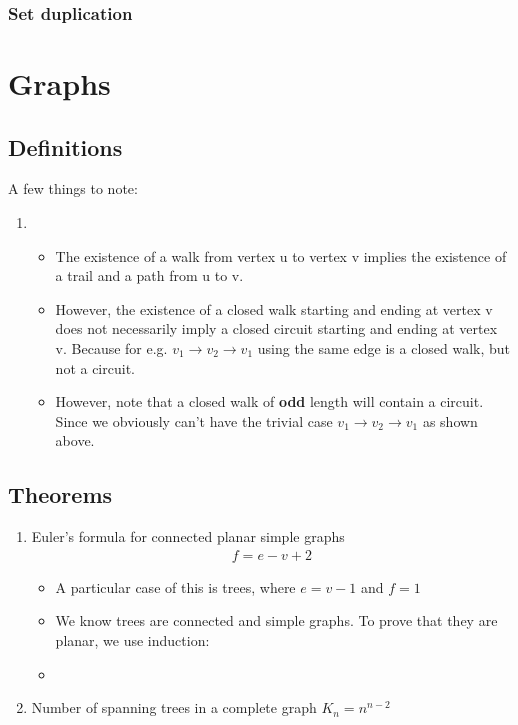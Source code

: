 \documentclass{article}
\begin{document}
\subsubsection{Set duplication}

\section{Graphs}

\subsection{Definitions}
A few things to note:
\begin{enumerate}
	\item \begin{itemize}
		\item The existence of a walk from vertex u to vertex v implies the existence of a trail and a path from u to v. 
		\item However, the existence of a closed walk starting and ending at vertex v does not necessarily imply a closed circuit starting and ending at vertex v. Because for e.g. $v_1 \rightarrow v_2 \rightarrow v_1$ using the same edge is a closed walk, but not a circuit.
		\item However, note that a closed walk of \textbf{odd} length will contain a circuit. Since we obviously can't have the trivial case $v_1 \rightarrow v_2 \rightarrow v_1$ as shown above.
	\end{itemize}
\end{enumerate}

\subsection{Theorems}
\begin{enumerate}
	\item Euler's formula for connected planar simple graphs
	\begin{align*}
		f = e - v + 2
	\end{align*}
	\begin{itemize}
		\item A particular case of this is trees, where $e=v-1$ and $f=1$
		\item We know trees are connected and simple graphs. To prove that they are planar, we use induction:
		\item 
	\end{itemize}
	\item Number of spanning trees in a complete graph $K_n=n^{n-2}$
\end{enumerate}
\end{document}
